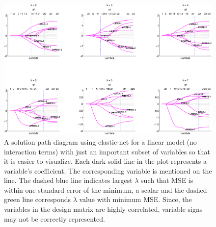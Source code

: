 \begin{figure}[!htbp]
\begin{center}
 \includegraphics[width=1\textwidth]{figures/solution_path_general.pdf}
 \caption{ A solution path diagram using elastic-net for a linear model (no interaction terms) with just an important subset of variables so that it is easier to visualize.  Each dark solid line in the plot represents a variable's coefficient. The corresponding variable is mentioned on the line. The dashed blue line indicates largest $\lambda$ such that MSE is within one standard error of the minimum, a scalar and the dashed green line corresponds $\lambda$ value with minimum MSE.  Since, the variables in the design matrix are highly correlated, variable signs may not be correctly represented.}
\label{fig:est:solution-path}
\end{center}
\end{figure}

